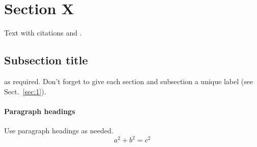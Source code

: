 \section{Section X}
\label{sec:x}
Text with citations \cite{RefB} and \cite{RefJ}.
\subsection{Subsection title}
\label{sec:20}
as required. Don't forget to give each section 
and subsection a unique label (see Sect.~\ref{sec:1}).
\paragraph{Paragraph headings} Use paragraph headings as needed.
\begin{equation}
a^2+b^2=c^2
\end{equation}

